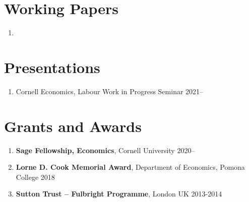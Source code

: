 \documentclass[letterpaper,11pt,oneside]{article}
\begin{document}

\section*{Working Papers}
\begin{enumerate}[itemsep=2.5pt, label={}]
    \item {}
\end{enumerate}


 
\section*{Presentations}
\begin{enumerate}[noitemsep, label={}]
    \item Cornell Economics, Labour Work in Progress Seminar 2021--
\end{enumerate}

\section*{Grants and Awards}
\begin{enumerate}[itemsep=2pt, label={}]
    \item \textbf{Sage Fellowship, Economics}, Cornell University 2020--
    \item \textbf{Lorne D. Cook Memorial Award}, Department of Economics, Pomona College 2018
    \item \textbf{Sutton Trust -- Fulbright Programme}, London UK 2013-2014  
\end{enumerate}
\end{document}

